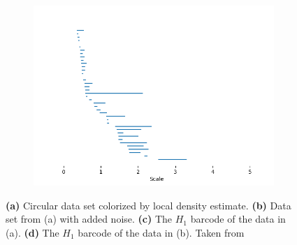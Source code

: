 \begin{figure}[h]
\begin{subfigure}{.45\textwidth}
    \caption{}
    \label{fig:barcode-circle}
  \end{subfigure}%
  \begin{subfigure}{.45\textwidth}
    \centering
    \includegraphics[width=.9\linewidth]{./figures/barcode-all-points}
    \caption{}
    \label{fig:barcode-all}
  \end{subfigure}
  \caption{
    \textbf{(a)} Circular data set colorized by local density estimate.
    \textbf{(b)} Data set from (a) with added noise.
    \textbf{(c)} The $H_1$ barcode of the data in (a).
    \textbf{(d)} The $H_1$ barcode of the data in (b).
    Taken from \cite[section 3.4]{botnanLesnick_2022}}
  \label{fig:circles-full}
\end{figure}

